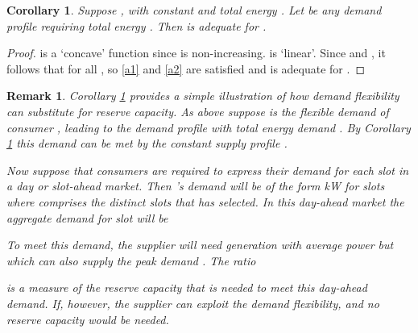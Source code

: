 \documentclass[10pt,draftcls,onecolumn]{IEEEtran}
\newtheorem{corollary}{Corollary}
\newtheorem{remark}{Remark}
\newcounter{l1}
\newcounter{l2}
\newcounter{l3}
\begin{document}
\begin{corollary}\label{cor:reserve}
Suppose , with  constant and total energy .  Let  be any demand profile requiring total energy .  Then  is adequate for .
\end{corollary}
\begin{proof}
 is a `concave' function since  is non-increasing.   is `linear'.  Since 
and , it follows that   for all , so \eqref{a1} and \eqref{a2} are satisfied and  is adequate for . 
\end{proof}
\begin{remark}
Corollary \ref{cor:reserve}  provides a simple illustration of how demand flexibility can substitute for reserve capacity.  As above suppose  is the 
flexible demand of consumer , leading to the demand profile  with total energy demand .  By Corollary \ref{cor:reserve} this demand can be met
by the constant supply profile .

Now suppose that consumers are required to express their demand for each slot in a day or  slot-ahead market.  Then  's demand will be of the form
kW for slots  where   comprises the  distinct slots that  has selected.  In this day-ahead market the aggregate demand for slot  will be 

To meet this demand, the supplier will need generation with average power  but which  can also supply the peak demand .   The  ratio 

 is a measure of the reserve capacity that is needed to meet this day-ahead demand.  If, however, the
supplier can exploit the demand flexibility,  and \textit{ no }reserve capacity would be needed.
\end{remark}
\end{document}
